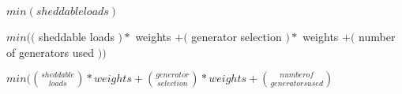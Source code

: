 \documentclass[10pt,journal,letterpaper,compsoc, draftclsnofoot, onecolumn]{IEEEtran} %
\newcommand*{\bfrac}[2]{\genfrac{(}{)}{0pt}{}{#1}{#2}} %
\begin{document}
\begin{math}
min (sheddable loads)
\end{math}

$min( ($  sheddable loads $) *$ weights $+ ($ generator selection $) * $ weights $+ ($ number of generators used $) )$ 

$min(\bfrac{sheddable}{loads} * weights +  \bfrac{generator}{selection} * weights +  \bfrac{number of}{generators used} $
\end{document}
